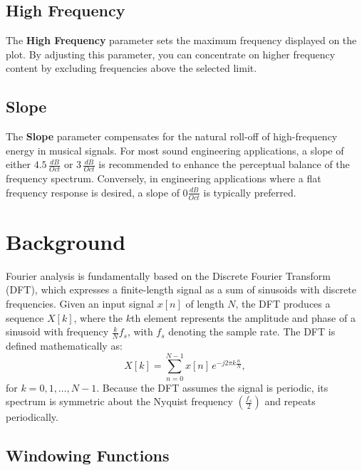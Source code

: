\documentclass[12pt,letter]{article}
\begin{document}
\subsection{High Frequency}

The \textbf{High Frequency} parameter sets the maximum frequency displayed on
the plot. By adjusting this parameter, you can concentrate on higher
frequency content by excluding frequencies above the selected limit.

\subsection{Slope}

The \textbf{Slope} parameter compensates for the natural roll-off of
high-frequency energy in musical signals. For most sound engineering
applications, a slope of either $4.5\,\frac{dB}{Oct}$ or $3\,\frac{dB}{Oct}$
is recommended to enhance the perceptual balance of the frequency spectrum.
Conversely, in engineering applications where a flat frequency response is
desired, a slope of $0\frac{dB}{Oct}$ is typically preferred.


\clearpage
\section{Background}

Fourier analysis is fundamentally based on the Discrete Fourier Transform
(DFT), which expresses a finite-length signal as a sum of sinusoids with
discrete frequencies. Given an input signal $x[n]$ of length $N$, the DFT
produces a sequence $X[k]$, where the $k$th element represents the amplitude
and phase of a sinusoid with frequency $\frac{k}{N}f_s$, with $f_s$ denoting
the sample rate. The DFT is defined mathematically as:
\begin{equation}
X[k] = \sum_{n=0}^{N-1} x[n] \, e^{-j2\pi k \frac{n}{N}},
\label{eqn:dft}
\end{equation}
for $k = 0, 1, \dots, N-1$. Because the DFT assumes the signal is periodic,
its spectrum is symmetric about the Nyquist frequency
$\left(\frac{f_s}{2}\right)$ and repeats periodically.

\subsection{Windowing Functions}
\end{document}
